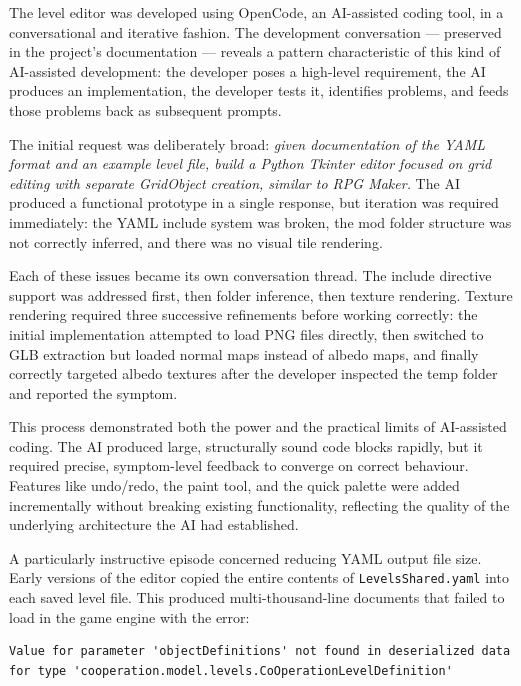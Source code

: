 The level editor was developed using OpenCode, an AI-assisted coding
tool, in a conversational and iterative fashion. The development
conversation --- preserved in the project's documentation --- reveals a
pattern characteristic of this kind of AI-assisted development: the
developer poses a high-level requirement, the AI produces an
implementation, the developer tests it, identifies problems, and feeds
those problems back as subsequent prompts.

The initial request was deliberately broad: \emph{given documentation of
the YAML format and an example level file, build a Python Tkinter editor
focused on grid editing with separate GridObject creation, similar to
RPG Maker.} The AI produced a functional prototype in a single response,
but iteration was required immediately: the YAML include system was
broken, the mod folder structure was not correctly inferred, and there
was no visual tile rendering.

Each of these issues became its own conversation thread. The include
directive support was addressed first, then folder inference, then
texture rendering. Texture rendering required three successive
refinements before working correctly: the initial implementation
attempted to load PNG files directly, then switched to GLB extraction
but loaded normal maps instead of albedo maps, and finally correctly
targeted albedo textures after the developer inspected the temp folder
and reported the symptom.

This process demonstrated both the power and the practical limits of
AI-assisted coding. The AI produced large, structurally sound code
blocks rapidly, but it required precise, symptom-level feedback to
converge on correct behaviour. Features like undo/redo, the paint tool,
and the quick palette were added incrementally without breaking existing
functionality, reflecting the quality of the underlying architecture the
AI had established.

A particularly instructive episode concerned reducing YAML output file
size. Early versions of the editor copied the entire contents of
\texttt{LevelsShared.yaml} into each saved level file. This produced
multi-thousand-line documents that failed to load in the game engine
with the error:

\begin{verbatim}
Value for parameter 'objectDefinitions' not found in deserialized data
for type 'cooperation.model.levels.CoOperationLevelDefinition'
\end{verbatim}


